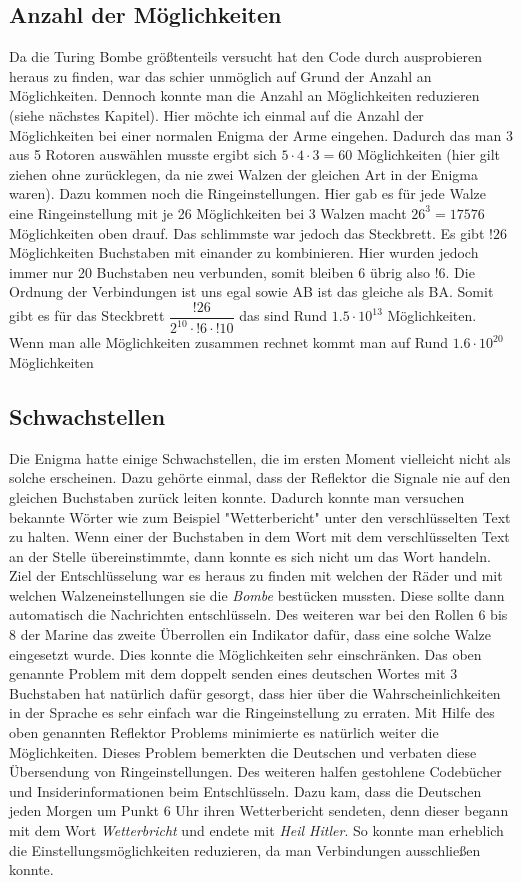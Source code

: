 \subsection{Anzahl der Möglichkeiten}
Da die Turing Bombe größtenteils versucht hat den Code durch ausprobieren heraus zu finden, war das schier unmöglich auf Grund der Anzahl an Möglichkeiten. Dennoch konnte man die Anzahl an Möglichkeiten reduzieren (siehe nächstes Kapitel). Hier möchte ich einmal auf die Anzahl der Möglichkeiten bei einer normalen Enigma der Arme eingehen. Dadurch das man 3 aus 5 Rotoren auswählen musste ergibt sich $5 \cdot 4 \cdot 3 = 60$ Möglichkeiten (hier gilt ziehen ohne zurücklegen, da nie zwei Walzen der gleichen Art in der Enigma waren). Dazu kommen noch die Ringeinstellungen. Hier gab es für jede Walze eine Ringeinstellung mit je 26 Möglichkeiten bei 3 Walzen macht $26^3 = 17576$ Möglichkeiten oben drauf. Das schlimmste war jedoch das Steckbrett. Es gibt $!26$ Möglichkeiten Buchstaben mit einander zu kombinieren. Hier wurden jedoch immer nur 20 Buchstaben neu verbunden, somit bleiben 6 übrig also $!6$. Die Ordnung der Verbindungen ist uns egal sowie AB ist das gleiche als BA. Somit gibt es für das Steckbrett $\dfrac{!26}{2^{10}\cdot!6\cdot!10}$ das sind Rund $1.5 \cdot 10^{13}$ Möglichkeiten. Wenn man alle Möglichkeiten zusammen rechnet kommt man auf Rund $1.6 \cdot 10^{20}$  Möglichkeiten\cite{emach}

\subsection{Schwachstellen}
Die Enigma hatte einige Schwachstellen, die im ersten Moment vielleicht nicht als solche erscheinen. Dazu gehörte einmal, dass der Reflektor die Signale nie auf den gleichen Buchstaben zurück leiten konnte. Dadurch konnte man versuchen bekannte Wörter wie zum Beispiel "Wetterbericht" unter den verschlüsselten Text zu halten. Wenn einer der Buchstaben in dem Wort mit dem verschlüsselten Text an der Stelle übereinstimmte, dann konnte es sich nicht um das Wort handeln. Ziel der Entschlüsselung war es heraus zu finden mit welchen der Räder und mit welchen Walzeneinstellungen sie die \emph{Bombe} bestücken mussten. Diese sollte dann automatisch die Nachrichten entschlüsseln. Des weiteren war bei den Rollen 6 bis 8 der Marine das zweite Überrollen ein Indikator dafür, dass eine solche Walze eingesetzt wurde. Dies konnte die Möglichkeiten sehr einschränken. Das oben genannte Problem mit dem doppelt senden eines deutschen Wortes mit 3 Buchstaben hat natürlich dafür gesorgt, dass hier über die Wahrscheinlichkeiten in der Sprache es sehr einfach war die Ringeinstellung zu erraten. Mit Hilfe des oben genannten Reflektor Problems minimierte es natürlich weiter die Möglichkeiten. Dieses Problem bemerkten die Deutschen und verbaten diese Übersendung von Ringeinstellungen. Des weiteren halfen gestohlene Codebücher und Insiderinformationen beim Entschlüsseln. Dazu kam, dass die Deutschen jeden Morgen  um Punkt 6 Uhr ihren Wetterbericht sendeten, denn dieser begann mit dem Wort \emph{Wetterbricht} und endete mit \emph{Heil Hitler}. So konnte man erheblich die Einstellungsmöglichkeiten reduzieren, da man Verbindungen ausschließen konnte.\cite{enigmaflaw} \cite{enigmaproblem1}

